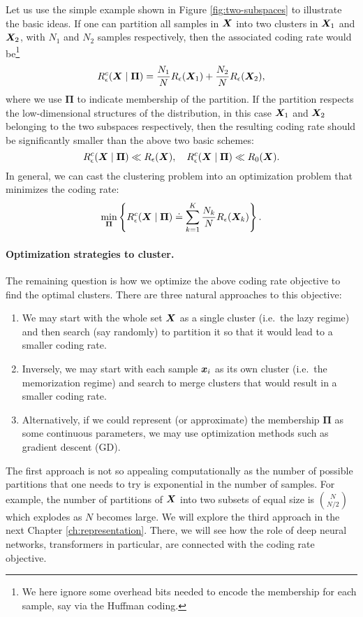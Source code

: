 \documentclass[../../book-main.tex]{subfiles}
\begin{document}
Let us use the simple example shown in Figure \ref{fig:two-subspaces} to illustrate the basic ideas. If one can partition all samples in $\bm{X}$ into two clusters in $\bm{X}_1$ and $\bm{X}_2$, with $N_1$ and $N_2$ samples respectively, then the associated coding rate would be\footnote{We here ignore some overhead bits needed to encode the membership for each sample, say via the Huffman coding.}
\begin{equation}
	R_{\epsilon}^c(\bm{X}\mid \boldsymbol{\Pi}) = \frac{N_1}{N}R_{\epsilon}(\bm{X}_1) + \frac{N_2}{N}R_{\epsilon}(\bm{X}_2),
\end{equation}
where we use $\boldsymbol{\Pi}$ to indicate membership of the partition. If the partition respects the low-dimensional structures of the distribution, in this case $\bm{X}_1$ and $\bm{X}_2$ belonging to the two subspaces respectively, then the resulting coding rate should be significantly smaller than the above two basic schemes:
\begin{equation}
	R_{\epsilon}^c(\bm{X} \mid \boldsymbol{\Pi}) \ll R_{\epsilon}(\bm{X}), \quad     R_{\epsilon}^c(\bm{X} \mid \boldsymbol{\Pi}) \ll R_0(\bm{X}).
\end{equation}
In general, we can cast the clustering problem into an optimization problem that minimizes the coding rate:
\begin{equation}
	\min_{\boldsymbol{\Pi}}  \left\{ R_{\epsilon}^c(\bm{X} \mid \boldsymbol{\Pi})
	\doteq \sum_{k=1}^K \frac{N_k}{N}R_{\epsilon}(\bm{X}_k)\right\}.
\end{equation}

\paragraph{Optimization strategies to cluster.}
The remaining question is how we optimize the above coding rate objective to find the optimal clusters. There are three natural approaches to this objective:
\begin{enumerate}
	\item We may start with the whole set $\bm{X}$ as a single cluster (i.e.\ the lazy regime) and then search (say randomly) to partition it so that it would lead to a smaller coding rate.
	\item Inversely, we may start with each sample $\bm{x}_i$ as its own cluster
		(i.e.\ the memorization regime)  and search to merge clusters that would result in a smaller coding rate.
	\item Alternatively, if we could represent (or approximate) the membership $\boldsymbol{\Pi}$ as some continuous parameters, we may use optimization methods such as gradient descent (GD).
\end{enumerate}
The first approach is not so appealing computationally as the number of possible partitions that one needs to try is exponential in the number of samples. For example, the number of partitions of $\bm{X}$ into two subsets of equal size is $N \choose N/2$ which explodes as $N$ becomes large. We will explore the third approach in the next Chapter \ref{ch:representation}. There, we will see how the role of deep neural networks, transformers in particular, are connected with the coding rate objective.
\end{document}
